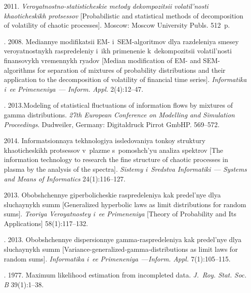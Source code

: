 \begin{multicols}{2}
{{\begin{thebibliography}{99}
 2011. \textit{Veroyatnostno-statisticheskie metody
dekompozitsii volatil'nosti khaoticheskikh protsessov} [Probabilistic and
statistical methods of decomposition of volatility of chaotic processes].
Moscow: Moscow University Publs. 512~p.

. 2008.   Mediannye modifikatsii EM- i~SEM-algoritmov
dlya razdeleniya smesey ve\-ro\-yat\-no\-st\-nykh raspredeleniy i~ikh primenenie 
k~dekompozitsii volatil'nosti finansovykh vremennykh ryadov [Median
modification of EM- and SEM-algorithms for separation of mixtures of
probability distributions and their application to the decomposition of volatility
of financial time series]. \textit{Informatika i~ee Primeneniya}~---
\textit{Inform. Appl.} 2(4):12--47.

. 2013.Modeling of statistical
fluctuations of information flows by mixtures of gamma distributions.
\textit{27th European Conference on Modelling and
Simulation Proceedings}. Dudweiler, Germany:
Digitaldruck Pirrot GmbHP. 569--572.

 2014. Informatsionnaya tekhnologiya issledovaniya
tonkoy struktury khaoticheskikh protsessov v~plazme s~po\-moshch'yu analiza
spektrov [The information technology to research the fine structure of
chaotic processes in plasma by the analysis of the spectra]. \textit{Sistemy
i~Sredstva Informatiki}~--- \textit{Systems and Means of Informatics}
24(1):116--127.

 2013. Obobshchennye giperbolicheskie raspredeleniya
kak predel'nye dlya sluchaynykh summ [Generalized hyperbolic laws as limit
distributions for random sums]. \textit{Teoriya Veroyatnostey i~ee
Primeneniya} [{Theory of Probability and Its Applications}]
58(1):117--132.

. 2013. Obobshchennye dispersionnye
gamma-raspredeleniya kak predel'nye dlya sluchaynykh summ
[Variance-generalized-gamma-distributions as limit laws for random sums].
\textit{Informatika i~ee Primeneniya}~---\textit{Inform. Appl.}
7(1):105--115.

. 1977. Maximum likelihood
estimation from incompleted data. \textit{J.~Roy. Stat.
Soc. B} 39(1):1--38.
\end{thebibliography}

 }
 }

\end{multicols}

